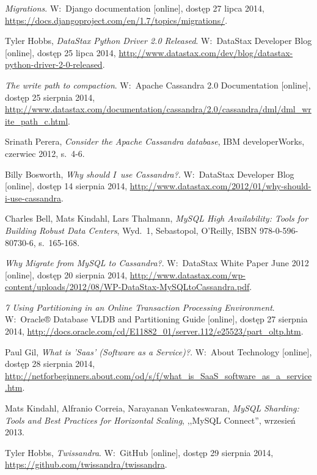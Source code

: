 \begin{thebibliography}{9}
\emph{Migrations}. W:~Django documentation [online], dostęp 27 lipca 2014, \url{https://docs.djangoproject.com/en/1.7/topics/migrations/}.

Tyler Hobbs, \emph{DataStax Python Driver 2.0 Released}. W:~DataStax Developer Blog [online], dostęp 25 lipca 2014, \url{http://www.datastax.com/dev/blog/datastax-python-driver-2-0-released}.

\emph{The write path to compaction}. W:~Apache Cassandra 2.0 Documentation [online], dostęp 25 sierpnia 2014, \url{http://www.datastax.com/documentation/cassandra/2.0/cassandra/dml/dml\_write\_path\_c.html}.

Srinath Perera, \emph{Consider the Apache Cassandra database}, IBM developerWorks, czerwiec 2012, s.~4-6.

Billy Bosworth, \emph{Why should I~use Cassandra?}. W:~DataStax Developer Blog [online], dostęp 14 sierpnia 2014, \url{http://www.datastax.com/2012/01/why-should-i-use-cassandra}.

Charles Bell, Mats Kindahl, Lars Thalmann, \emph{MySQL High Availability: Tools for Building Robust Data Centers}, Wyd.~1, Sebastopol, O'Reilly, ISBN 978-0-596-80730-6, s.~165-168.

\emph{Why Migrate from MySQL to Cassandra?}. W:~DataStax White Paper June 2012 [online], dostęp 20 sierpnia 2014, \url{http://www.datastax.com/wp-content/uploads/2012/08/WP-DataStax-MySQLtoCassandra.pdf}.

\emph{7 Using Partitioning in an Online Transaction Processing Environment}. W:~Oracle® Database VLDB and Partitioning Guide [online], dostęp 27 sierpnia 2014, \url{http://docs.oracle.com/cd/E11882\_01/server.112/e25523/part\_oltp.htm}.

Paul Gil, \emph{What is 'Saas' (Software as a Service)?}. W:~About Technology [online], dostęp 28 sierpnia 2014, \url{http://netforbeginners.about.com/od/s/f/what\_is\_SaaS\_software\_as\_a\_service.htm}.

Mats Kindahl, Alfranio Correia, Narayanan Venkateswaran, \emph{MySQL Sharding: Tools and Best Practices for Horizontal Scaling}, ,,MySQL Connect'', wrzesień 2013.

Tyler Hobbs, \emph{Twissandra}. W:~GitHub [online], dostęp 29 sierpnia 2014, \url{https://github.com/twissandra/twissandra}.


\end{thebibliography}
